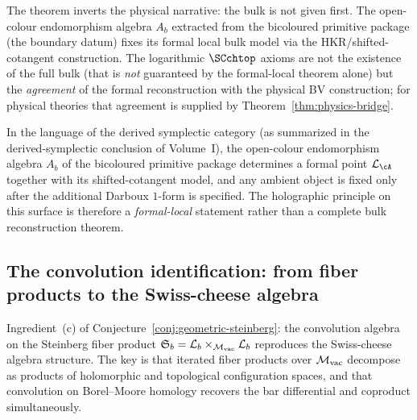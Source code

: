 \begin{remark}
\label{rem:boundary-creates-bulk}
The theorem inverts the physical narrative: the bulk is not given
first. The open-colour endomorphism algebra $A_b$ extracted from the
bicoloured primitive package (the boundary datum) fixes
its formal local bulk model via the
HKR/shifted-cotangent construction. The logarithmic
$\SCchtop$ axioms are not
the existence of the full bulk (that is \emph{not} guaranteed by the
formal-local theorem alone) but the
\emph{agreement} of the formal reconstruction with the physical
BV construction; for physical theories that agreement is supplied
by Theorem~\ref{thm:physics-bridge}.

In the language of the derived symplectic category
\textup{(}as summarized in the derived-symplectic conclusion of Volume~I\textup{)}, the open-colour endomorphism algebra $A_b$ of the bicoloured primitive package determines a
formal point $\cL_\cA$ together with its shifted-cotangent model,
and any ambient object is fixed only after the additional Darboux
$1$-form is specified. The holographic principle on this surface is
therefore a \emph{formal-local} statement rather than a complete bulk
reconstruction theorem.
\end{remark}


\subsection{The convolution identification: from fiber products to the
Swiss-cheese algebra}
\label{ssec:convolution-identification}

\providecommand{\Steinb}{\mathfrak{S}}
\providecommand{\BM}{\mathrm{BM}}
\providecommand{\Conf}{\operatorname{Conf}}
\providecommand{\FM}{\operatorname{FM}}

Ingredient~(c) of
Conjecture~\ref{conj:geometric-steinberg}: the convolution algebra on
the Steinberg fiber product $\Steinb_b = \cL_b
\times_{\cM_{\mathrm{vac}}} \cL_b$ reproduces the Swiss-cheese
algebra structure. The key is that iterated fiber products over
$\mathcal M_{\mathrm{vac}}$ decompose as products of holomorphic and
topological configuration spaces, and that convolution on
Borel--Moore homology recovers the bar differential and coproduct
simultaneously.

